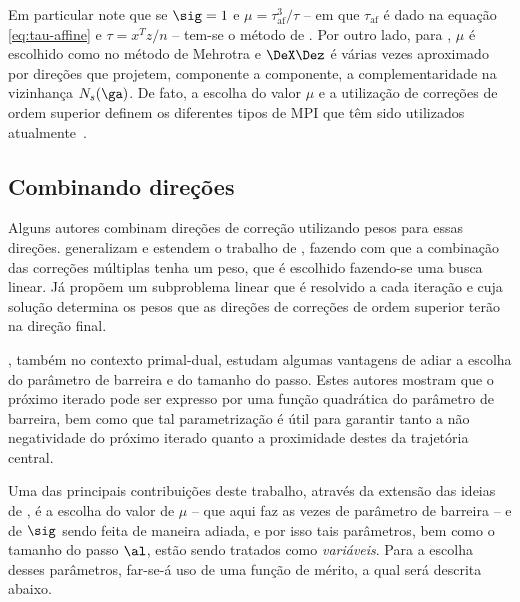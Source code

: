 Em particular note
que se  $\sig = 1$ e $\mu = \tau_{\text{af}}^3/\tau$ -- em que $\tau_{\text{af}}$ é dado
na equação \eqref{eq:tau-affine} e $\tau=x^Tz/n$ -- tem-se o método de
\textcite{Mehrotra:1992wr}. Por outro lado, para \textcite{Gondzio:1996uw}, $\mu$ é
escolhido como no método de Mehrotra e $\DeX\Dez$ é várias vezes aproximado por
direções que projetem, componente a componente, a complementaridade na
vizinhança $N_s(\ga)$. De fato, a escolha do valor $\mu$ e a utilização de
correções de ordem superior definem os diferentes tipos de \ac{MPI} que têm sido
utilizados atualmente~\cite{Wright:Primal-dual-interior-point:1997h}.




\subsection{Combinando direções}




Alguns autores 
combinam direções de correção utilizando pesos para essas direções.
 \textcite{Colombo:2008ia} generalizam e estendem o trabalho de \textcite{Gondzio:1996uw},
fazendo com que a combinação das correções múltiplas  tenha um peso, que é
escolhido fazendo-se uma busca linear. Já \textcite{Jarre:1999tl}  propõem um subproblema
linear que é resolvido a cada iteração e cuja solução determina os pesos que as direções de 
correções de ordem superior terão na direção final. 

\textcite{VillasBoas:2003tg}, também no contexto primal-dual, estudam algumas
vantagens de adiar a escolha do parâmetro de barreira e do tamanho do passo.
Estes autores mostram que o próximo iterado pode ser expresso por uma função
quadrática do parâmetro de barreira, bem como que tal parametrização é útil
para garantir tanto a não negatividade do próximo iterado quanto a proximidade destes da
trajetória central. 

Uma das principais contribuições deste trabalho, através da extensão das ideias
de \textcite{VillasBoas:2003tg}, é a escolha do valor de $\mu$ -- que aqui faz as
vezes de parâmetro de barreira -- e de $\sig$  sendo feita de maneira adiada, e
por isso tais parâmetros, bem como o tamanho do passo $\al$, estão sendo
tratados como \emph{variáveis}. Para a escolha desses parâmetros, far-se-á uso de uma
função de mérito, a qual será descrita abaixo.
 
